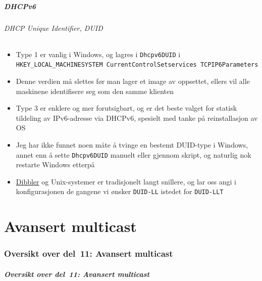 \begin{frame}
  \frametitle{DHCPv6}
  \framesubtitle{DHCP Unique Identifier, DUID}
  \begin{itemize}
  \item Type 1 er vanlig i Windows, og lagres i \texttt{Dhcpv6DUID} i
    \texttt{HKEY\_LOCAL\_MACHINE\Textbackslash SYSTEM\Textbackslash
      CurrentControlSet\Textbackslash services\Textbackslash
      TCPIP6\Textbackslash Parameters}
  \item Denne verdien må slettes før man lager et image av oppsettet,
    ellers vil alle maskinene identifisere seg som den samme klienten
  \item Type 3 er enklere og mer forutsigbart, og er det beste valget
    for statisk tildeling av IPv6-adresse via DHCPv6, spesielt med
    tanke på reinstallasjon av OS
  \item Jeg har ikke funnet noen måte å tvinge en bestemt DUID-type i
    Windows, annet enn å sette \texttt{Dhcpv6DUID} manuelt eller
    gjennom skript, og naturlig nok restarte Windows etterpå
  \item \href{http://klub.com.pl/dhcpv6/}{Dibbler} og Unix-systemer er
    tradisjonelt langt snillere, og lar oss angi i konfigurasjonen de
    gangene vi ønsker \texttt{DUID-LL} istedet for \texttt{DUID-LLT}
  \end{itemize}
\end{frame}

\part{Avansert multicast}

\begin{frame}
  \partpage
\end{frame}

\section*{Oversikt over del~11: Avansert multicast}
\begin{frame}
  \frametitle{Oversikt over del~11: Avansert multicast}
    \tableofcontents
\end{frame}

